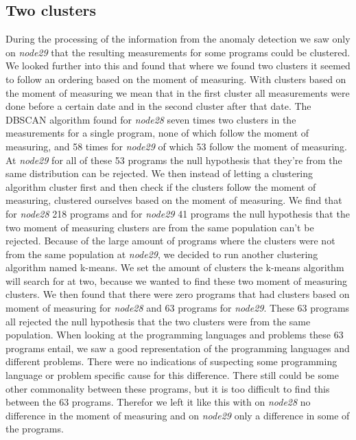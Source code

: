 \subsection{Two clusters}
During the processing of the information from the anomaly detection we saw only on \textit{node29} that the resulting measurements for some programs could be clustered. We looked further into this and found that where we found two clusters it seemed to follow an ordering based on the moment of measuring. With clusters based on the moment of measuring we mean that in the first cluster all measurements were done before a certain date and in the second cluster after that date. The DBSCAN algorithm found for \textit{node28} seven times two clusters in the measurements for a single program, none of which follow the moment of measuring, and 58 times for \textit{node29} of which 53 follow the moment of measuring. At \textit{node29} for all of these 53 programs the null hypothesis that they're from the same distribution can be rejected. We then instead of letting a clustering algorithm cluster first and then check if the clusters follow the moment of measuring, clustered ourselves based on the moment of measuring. We find that for \textit{node28} 218 programs and for \textit{node29} 41 programs the null hypothesis that the two moment of measuring clusters are from the same population can't be rejected. Because of the large amount of programs where the clusters were not from the same population at \textit{node29}, we decided to run another clustering algorithm named k-means. We set the amount of clusters the k-means algorithm will search for at two, because we wanted to find these two moment of measuring clusters. We then found that there were zero programs that had clusters based on moment of measuring for \textit{node28} and 63 programs for \textit{node29}. These 63 programs all rejected the null hypothesis that the two clusters were from the same population. When looking at the programming languages and problems these 63 programs entail, we saw a good representation of the programming languages and different problems. There were no indications of suspecting some programming language or problem specific cause for this difference. There still could be some other commonality between these programs, but it is too difficult to find this between the 63 programs. Therefor we left it like this with on \textit{node28} no difference in the moment of measuring and on \textit{node29} only a difference in some of the programs.

